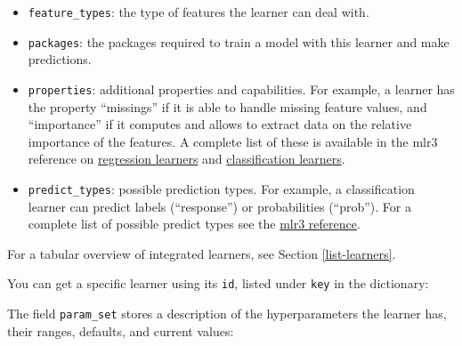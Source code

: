 \documentclass[
  11pt,
  parskip=half,
  DIV=calc,
  BCOR=10mm,
  x11names]{scrbook}
\newenvironment{Shaded}{}{}
\newcommand{\KeywordTok}[1]{\textcolor[rgb]{0.00,0.00,1.00}{#1}}
\newcommand{\NormalTok}[1]{#1}
\newcommand{\OperatorTok}[1]{#1}
\newcommand{\StringTok}[1]{\textcolor[rgb]{0.00,0.50,0.50}{#1}}
\providecommand{\tightlist}{%
  \setlength{\itemsep}{0pt}\setlength{\parskip}{0pt}}
\begin{document}
\begin{itemize}
\tightlist
\item
  \texttt{feature\_types}: the type of features the learner can deal with.
\item
  \texttt{packages}: the packages required to train a model with this learner and make predictions.
\item
  \texttt{properties}: additional properties and capabilities.
  For example, a learner has the property ``missings'' if it is able to handle missing feature values, and ``importance'' if it computes and allows to extract data on the relative importance of the features.
  A complete list of these is available in the mlr3 reference on \href{https://mlr3.mlr-org.com/reference/LearnerRegr.html\#construction}{regression learners} and \href{https://mlr3.mlr-org.com/reference/LearnerClassif.html\#construction}{classification learners}.
\item
  \texttt{predict\_types}: possible prediction types. For example, a classification learner can predict labels (``response'') or probabilities (``prob''). For a complete list of possible predict types see the \href{https://mlr3.mlr-org.com/reference/Learner.html\#construction}{mlr3 reference}.
\end{itemize}

For a tabular overview of integrated learners, see Section \ref{list-learners}.

You can get a specific learner using its \texttt{id}, listed under \texttt{key} in the dictionary:

\begin{Shaded}
\end{Shaded}

The field \texttt{param\_set} stores a description of the hyperparameters the learner has, their ranges, defaults, and current values:
\end{document}
